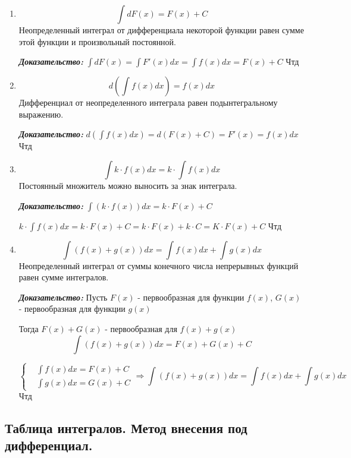 \documentclass[a4paper,12pt]{article}
\theoremstyle{plain} %
\theoremstyle{definition} %
\theoremstyle{remark} %
\begin{document}
\begin{enumerate}
	\item \[ \int dF(x) = F(x) + C \]
	      Неопределенный интеграл от дифференциала некоторой функции равен сумме этой функции и произвольный постоянной.

	      \textit{\textbf{Доказательство:}} $\int dF(x) = \int F'(x)dx = \int f(x)dx = F(x) + C$ Чтд

	\item \[ d \left( \int f(x) dx \right) = f(x)dx  \]
	      Дифференциал от неопределенного интеграла равен подынтегральному выражению.

	      \textit{\textbf{Доказательство:}} $d\left( \int f(x)dx \right) = d \left( F(x) + C \right) = F'(x) = f(x)dx$ Чтд

	\item \[ \int k \cdot f(x) dx = k \cdot \int f(x) dx \]
	      Постоянный множитель можно выносить за знак интеграла.

	      \textit{\textbf{Доказательство:}} $\int (k \cdot f(x)) dx = k \cdot F(x) + C$

	      $k \cdot \int f(x) dx = k \cdot F(x) + C = k \cdot F(x) + k \cdot C = K\cdot F(x) + C$ Чтд

	\item \[ \int (f(x) + g(x)) dx = \int f(x) dx + \int g(x) dx \]
	      Неопределенный интеграл от суммы конечного числа непрерывных функций равен сумме интегралов.

	      \textit{\textbf{Доказательство:}} Пусть $F(x)$ - первообразная для функции $f(x)$, $G(x)$ - первообразная для функции $g(x)$

	      Тогда $F(x) + G(x)$ - первообразная для $f(x) + g(x)$ \[ \int (f(x) + g(x))dx = F(x) + G(x) + C \]

	      \[ \begin{cases}
			       & \int f(x)dx = F(x) + C  \\
			       & \int g(x) dx = G(x) + C
		      \end{cases} \Rightarrow \int (f(x) + g(x))dx = \int f(x)dx + \int g(x) dx\]
	      Чтд
\end{enumerate}



\newpage
\subsection*{Таблица интегралов. Метод внесения под дифференциал.}
\end{document}
